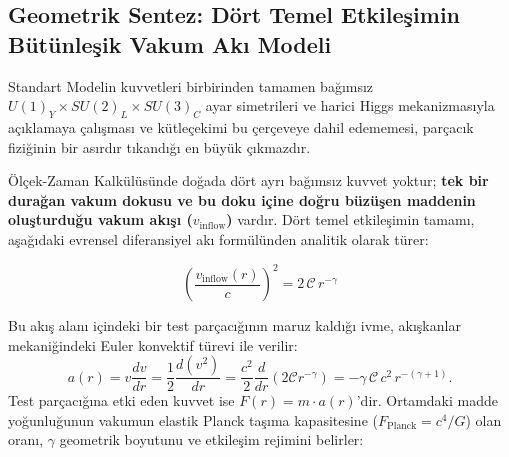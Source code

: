 \subsection{Geometrik Sentez: Dört Temel Etkileşimin Bütünleşik Vakum Akı Modeli}
\label{sec:buyuk_sentez_ana}

Standart Modelin kuvvetleri birbirinden tamamen bağımsız $U(1)_Y \times SU(2)_L \times SU(3)_C$ ayar simetrileri ve harici Higgs mekanizmasıyla açıklamaya çalışması ve kütleçekimi bu çerçeveye dahil edememesi, parçacık fiziğinin bir asırdır tıkandığı en büyük çıkmazdır.

Ölçek-Zaman Kalkülüsünde doğada dört ayrı bağımsız kuvvet yoktur; \textbf{tek bir durağan vakum dokusu ve bu doku içine doğru büzüşen maddenin oluşturduğu vakum akışı ($v_{\mathrm{inflow}}$)} vardır. Dört temel etkileşimin tamamı, aşağıdaki evrensel diferansiyel akı formülünden analitik olarak türer:

\begin{equation}
    \boxed{ \left( \frac{v_{\mathrm{inflow}}(r)}{c} \right)^2 = 2 \, \mathcal{C} \, r^{-\gamma} }
    \label{eq:master_sentez_main}
\end{equation}

Bu akış alanı içindeki bir test parçacığının maruz kaldığı ivme, akışkanlar mekaniğindeki Euler konvektif türevi ile verilir:
\begin{equation}
    a(r) = v \frac{dv}{dr} = \frac{1}{2} \frac{d(v^2)}{dr} = \frac{c^2}{2} \frac{d}{dr}\left( 2\mathcal{C} r^{-\gamma} \right) = -\gamma \, \mathcal{C} \, c^2 \, r^{-(\gamma + 1)}.
    \label{eq:euler_ivme_main}
\end{equation}
Test parçacığına etki eden kuvvet ise $F(r) = m \cdot a(r)$'dir. Ortamdaki madde yoğunluğunun vakumun elastik Planck taşıma kapasitesine ($F_{\mathrm{Planck}} = c^4/G$) olan oranı, $\gamma$ geometrik boyutunu ve etkileşim rejimini belirler:

